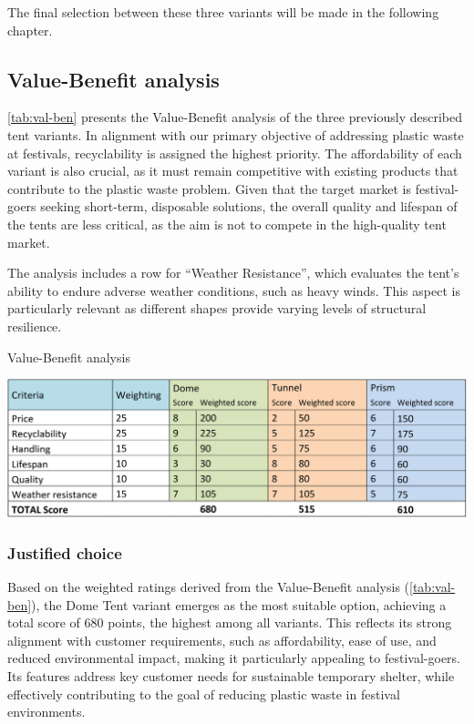 \documentclass{article}
\begin{document}
The final selection between these three variants will be made in the following chapter.

\subsection{Value-Benefit analysis}
\autoref{tab:val-ben} presents the Value-Benefit analysis of the three previously described tent variants. In
alignment with our primary objective of addressing plastic waste at festivals, recyclability is
assigned the highest priority. The affordability of each variant is also crucial, as it must remain
competitive with existing products that contribute to the plastic waste problem. Given that
the target market is festival-goers seeking short-term, disposable solutions, the overall quality
and lifespan of the tents are less critical, as the aim is not to compete in the
high-quality tent market.

The analysis includes a row for ``Weather Resistance'', which evaluates the tent's ability to
endure adverse weather conditions, such as heavy winds. This aspect is particularly relevant
as different shapes provide varying levels of structural resilience.

\begin{table}[ht!]
    \centering
    \caption{Value-Benefit analysis}
    \includegraphics[width=.85\textwidth]{media/val-ben.png}
    \label{tab:val-ben}
\end{table}

\subsubsection{Justified choice}
Based on the weighted ratings derived from the Value-Benefit analysis (\autoref{tab:val-ben}),
the Dome Tent variant emerges as the most suitable option, achieving a total score of 680
points, the highest among all variants. This reflects its strong alignment with customer
requirements, such as affordability, ease of use, and reduced environmental impact,
making it particularly appealing to festival-goers. Its features address key customer
needs for sustainable temporary shelter, while effectively contributing to the goal of
reducing plastic waste in festival environments.
\end{document}
